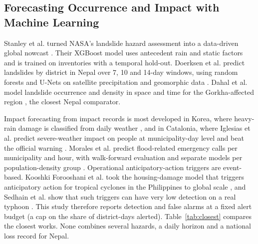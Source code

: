 \documentclass[conference]{IEEEtran}
\begin{document}
\subsection{Forecasting Occurrence and Impact with Machine Learning}
Stanley et al. turned NASA's landslide hazard assessment into a data-driven global nowcast \cite{Stanley2021}. Their XGBoost model uses antecedent rain and static factors and is trained on inventories with a temporal hold-out. Doerksen et al. predict landslides by district in Nepal over 7, 10 and 14-day windows, using random forests and U-Nets on satellite precipitation and geomorphic data \cite{Doerksen2023}. Dahal et al. model landslide occurrence and density in space and time for the Gorkha-affected region \cite{DahalA2024}, the closest Nepal comparator.

Impact forecasting from impact records is most developed in Korea, where heavy-rain damage is classified from daily weather \cite{Choi2018,Kim2019a,KOSHAM2025}, and in Catalonia, where Iglesias et al. predict severe-weather impact on people at municipality-day level and beat the official warning \cite{Iglesias2024}. Morales et al. predict flood-related emergency calls per municipality and hour, with walk-forward evaluation and separate models per population-density group \cite{Morales2026}. Operational anticipatory-action triggers are event-based. Kooshki Forooshani et al. took the housing-damage model that triggers anticipatory action for tropical cyclones in the Philippines to global scale \cite{KooshkiForooshani2024}, and Sedhain et al. show that such triggers can have very low detection on a real typhoon \cite{Sedhain2025}. This study therefore reports detection and false alarms at a fixed alert budget (a cap on the share of district-days alerted). Table~\ref{tab:closest} compares the closest works. None combines several hazards, a daily horizon and a national loss record for Nepal.
\end{document}
